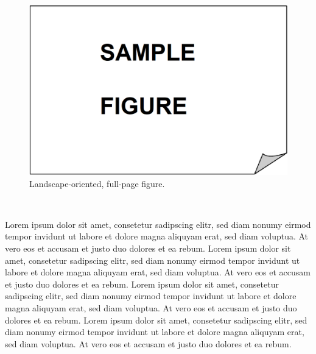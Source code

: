\begin{landscape}
\thispagestyle{empty}
\vspace{6pt}
\begin{figure}[htp!]
      \centering
      \includegraphics[width=500pt,keepaspectratio=true]{./fig/sekil3.png}
      \caption{Landscape-oriented, full-page figure.}    
      \label{fig:ch2-3}
\end{figure}
\vspace{-6pt}
\vfill\hbox{ }

\ifodd\value{page} %
\end{landscape}

Lorem ipsum dolor sit amet, consetetur sadipscing elitr, sed diam nonumy eirmod tempor invidunt ut labore et dolore magna aliquyam erat, sed diam voluptua. At vero eos et accusam et justo duo dolores et ea rebum. Lorem ipsum dolor sit amet, consetetur sadipscing elitr, sed diam nonumy eirmod tempor invidunt ut labore et dolore magna aliquyam erat, sed diam voluptua. At vero eos et accusam et justo duo dolores et ea rebum. Lorem ipsum dolor sit amet, consetetur sadipscing elitr, sed diam nonumy eirmod tempor invidunt ut labore et dolore magna aliquyam erat, sed diam voluptua. At vero eos et accusam et justo duo dolores et ea rebum. Lorem ipsum dolor sit amet, consetetur sadipscing elitr, sed diam nonumy eirmod tempor invidunt ut labore et dolore magna aliquyam erat, sed diam voluptua. At vero eos et accusam et justo duo dolores et ea rebum.

